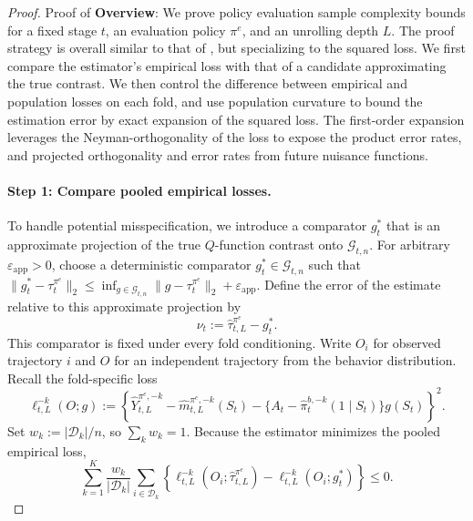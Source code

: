 \documentclass[opre,nonblindrev]{informs4}
\providecommand{\cD}{\mathcal D}
\providecommand{\cG}{\mathcal G}
\newcommand{\norm}[1]{\lVert#1\rVert}
\newcommand{\blipadv}{\tau}
\begin{document}
\begin{proof}{Proof of }
\textbf{Overview}: 
We prove policy evaluation sample complexity bounds for a fixed stage $t$, an evaluation policy $\pi^e$, and an unrolling depth $L$. The proof strategy is overall similar to that of \citet{foster2019orthogonal,lewis2021double}, but specializing to the squared loss.
We first compare the estimator's empirical loss with that of a
candidate approximating the true contrast. We then control the difference
between empirical and population losses on each fold, and use population
curvature to bound the estimation error by exact expansion of the squared loss. The first-order expansion leverages the Neyman-orthogonality of the loss to expose the product error rates, and projected orthogonality and error rates from future nuisance functions. 


\paragraph{Step 1: Compare pooled empirical losses.}
To handle potential misspecification, we introduce a comparator $g_t^*$ that is an approximate projection of the true
$Q$-function contrast onto $\cG_{t,n}$. For arbitrary $\varepsilon_{\mathrm{app}}>0$, choose a deterministic comparator $g_t^*\in\cG_{t,n}$ such that
$
\norm{g_t^*-\blipadv_t^{\pi^e}}_2
\leq\inf_{g\in\cG_{t,n}}
\norm{g-\blipadv_t^{\pi^e}}_2+\varepsilon_{\mathrm{app}}$.
 Define the error of the estimate
relative to this approximate projection by
\[
\nu_t:=\hat\blipadv_{t,L}^{\pi^e}-g_t^*.
\]
This comparator is fixed under every fold conditioning.
Write $O_i$ for observed trajectory $i$ and $O$ for an independent
trajectory from the behavior distribution. Recall the fold-specific loss
\[
\ell_{t,L}^{-k}(O;g)
:=\left\{\hat Y_{t,L}^{\pi^e,-k}
-\hat m_{t,L}^{\pi^e,-k}(S_t)
-\{A_t-\hat\pi_t^{b,-k}(1\mid S_t)\}g(S_t)\right\}^2.
\]
Set $w_k:=|\cD_k|/n$, so $\sum_k w_k=1$.
Because the estimator minimizes the pooled empirical loss,
\[
\sum_{k=1}^K\frac{w_k}{|\cD_k|}\sum_{i\in\cD_k}
\left\{\ell_{t,L}^{-k}(O_i;\hat\blipadv_{t,L}^{\pi^e})
-\ell_{t,L}^{-k}(O_i;g_t^*)\right\}\leq0.
\]


\end{proof}
\end{document}
